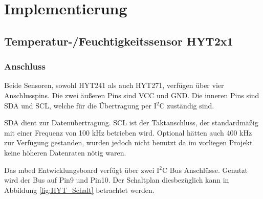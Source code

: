 \chapter{Implementierung}
	\section{Temperatur-/Feuchtigkeitssensor HYT2x1}
		\subsection{Anschluss}
			Beide Sensoren, sowohl HYT241 als auch HYT271, verfügen über vier Anschlusspins. Die zwei äußeren Pins sind VCC und GND. Die inneren Pins sind SDA und SCL, welche für die Übertragung per I$^{2}$C zuständig sind.
			
			SDA dient zur Datenübertragung. SCL ist der Taktanschluss, der standardmäßig mit einer Frequenz von 100 kHz betrieben wird. Optional hätten auch 400 kHz zur Verfügung gestanden, wurden jedoch nicht benutzt da im vorliegen Projekt keine höheren Datenraten nötig waren.
			
			Das mbed Entwicklungsboard verfügt über zwei I$^{2}$C Bus Anschlüsse. Genutzt wird der Bus auf Pin9 und Pin10. Der Schaltplan diesbezüglich kann in Abbildung \ref{fig:HYT_Schalt} betrachtet werden.
			
